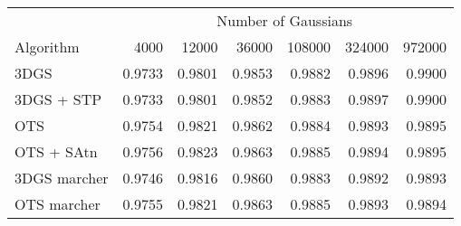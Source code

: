 \begin{tabular}{lrrrrrr}
\toprule
& \multicolumn{6}{c}{Number of Gaussians} \\
Algorithm & 4000 & 12000 & 36000 & 108000 & 324000 & 972000 \\

\midrule
3DGS & 0.9733 & 0.9801 & 0.9853 & 0.9882 & 0.9896 & 0.9900 \\
3DGS + STP & 0.9733 & 0.9801 & 0.9852 & 0.9883 & 0.9897 & 0.9900 \\
OTS & 0.9754 & 0.9821 & 0.9862 & 0.9884 & 0.9893 & 0.9895 \\
OTS + SAtn & 0.9756 & 0.9823 & 0.9863 & 0.9885 & 0.9894 & 0.9895 \\
3DGS marcher & 0.9746 & 0.9816 & 0.9860 & 0.9883 & 0.9892 & 0.9893 \\
OTS marcher & 0.9755 & 0.9821 & 0.9863 & 0.9885 & 0.9893 & 0.9894 \\
\bottomrule
\end{tabular}
